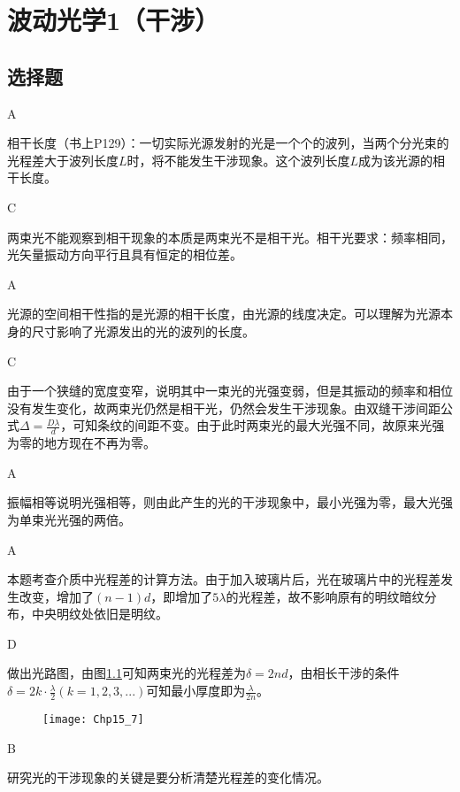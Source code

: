 \chapter{波动光学1（干涉）}
\makeatletter
{}
\makeatother
\section{选择题}
\exercise A

\solve 相干长度（书上P129）：一切实际光源发射的光是一个个的波列，当两个分光束的光程差大于波列长度$L$时，将不能发生干涉现象。这个波列长度$L$成为该光源的相干长度。 

\exercise C

\solve 两束光不能观察到相干现象的本质是两束光不是相干光。相干光要求：频率相同，光矢量振动方向平行且具有恒定的相位差。

\exercise A

\solve 光源的空间相干性指的是光源的相干长度，由光源的线度决定。可以理解为光源本身的尺寸影响了光源发出的光的波列的长度。

\exercise C

\solve 由于一个狭缝的宽度变窄，说明其中一束光的光强变弱，但是其振动的频率和相位没有发生变化，故两束光仍然是相干光，仍然会发生干涉现象。由双缝干涉间距公式$\Delta=\frac{D\lambda}{d}$，可知条纹的间距不变。由于此时两束光的最大光强不同，故原来光强为零的地方现在不再为零。

\exercise A

\solve 振幅相等说明光强相等，则由此产生的光的干涉现象中，最小光强为零，最大光强为单束光光强的两倍。

\exercise A

\solve 本题考查介质中光程差的计算方法。由于加入玻璃片后，光在玻璃片中的光程差发生改变，增加了$(n-1)d$，即增加了$5\lambda$的光程差，故不影响原有的明纹暗纹分布，中央明纹处依旧是明纹。

\exercise D

\solve 做出光路图，由图\ref{fig:15_7}可知两束光的光程差为$\delta=2nd$，由相长干涉的条件$\delta=2k\cdot\frac{\lambda}{2}(k=1,2,3,...)$可知最小厚度即为$\frac{\lambda}{2n}$。
\begin{figure}[!h]
	\centering
	\texttt{[image: Chp15\_7]}
	\caption{}\label{fig:15_7}
\end{figure}

\exercise B

\solve 研究光的干涉现象的关键是要分析清楚光程差的变化情况。

